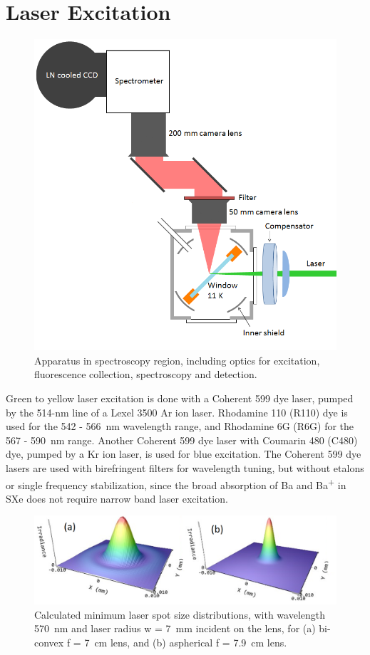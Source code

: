 \section{Laser Excitation}
\label{sec:laser}

\begin{figure} %
        \centering
                \includegraphics[width=.7\textwidth]{figures/window_etc_justOptics.png}
                \caption{Apparatus in spectroscopy region, including optics for excitation, fluorescence collection, spectroscopy and detection.}
\label{fig:endOfBeamOptics}
\end{figure}

Green to yellow laser excitation is done with a Coherent 599 dye laser, pumped by the 514-nm line of a Lexel 3500 Ar ion laser.  Rhodamine 110 (R110) dye is used for the 542 - 566~nm wavelength range, and Rhodamine 6G (R6G) for the 567 - 590~nm range.  Another Coherent 599 dye laser with Coumarin 480 (C480) dye, pumped by a Kr ion laser, is used for blue excitation.  The Coherent 599 dye lasers are used with birefringent filters for wavelength tuning, but without etalons or single frequency stabilization, since the broad absorption of Ba and Ba\textsuperscript{+} in SXe does not require narrow band laser excitation.

\begin{figure} %
        \centering
                \includegraphics[width=.7\textwidth]{figures/DFairbank_aber.png}
                \caption{Calculated minimum laser spot size distributions, with wavelength 570~nm and laser radius w = 7~mm incident on the lens, for (a) bi-convex f = 7~cm lens, and (b) aspherical f = 7.9~cm lens.  \cite{DFairbank}}
\label{fig:DFairbank}
\end{figure}

